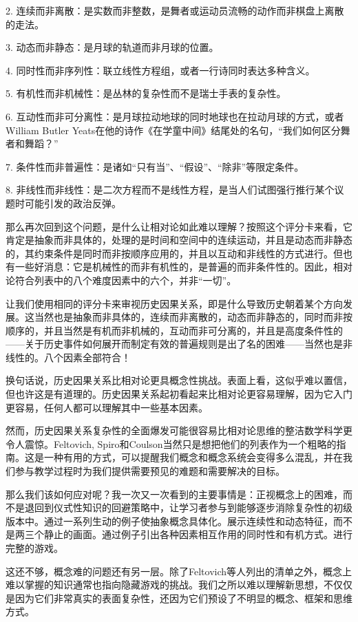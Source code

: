 2.	连续而非离散：是实数而非整数，是舞者或运动员流畅的动作而非棋盘上离散的走法。

3.	动态而非静态：是月球的轨道而非月球的位置。

4.	同时性而非序列性：联立线性方程组，或者一行诗同时表达多种含义。

5.	有机性而非机械性：是丛林的复杂性而不是瑞士手表的复杂性。

6.	互动性而非可分离性：是月球拉动地球的同时地球也在拉动月球的方式，或者William Butler Yeats在他的诗作《在学童中间》结尾处的名句，“我们如何区分舞者和舞蹈？”

7.	条件性而非普遍性：是诸如“只有当”、“假设”、“除非”等限定条件。

8.	非线性而非线性：是二次方程而不是线性方程，是当人们试图强行推行某个议题时可能引发的政治反弹。

那么再次回到这个问题，是什么让相对论如此难以理解？按照这个评分卡来看，它肯定是抽象而非具体的，处理的是时间和空间中的连续运动，并且是动态而非静态的，其约束条件是同时而非按顺序应用的，并且以互动和非线性的方式进行。但也有一些好消息：它是机械性的而非有机性的，是普遍的而非条件性的。因此，相对论符合列表中的八个难度因素中的六个，并非“一切”。

让我们使用相同的评分卡来审视历史因果关系，即是什么导致历史朝着某个方向发展。这当然也是抽象而非具体的，连续而非离散的，动态而非静态的，同时而非按顺序的，并且当然是有机而非机械的，互动而非可分离的，并且是高度条件性的——关于历史事件如何展开而制定有效的普遍规则是出了名的困难——当然也是非线性的。八个因素全部符合！

换句话说，历史因果关系比相对论更具概念性挑战。表面上看，这似乎难以置信，但也许这是有道理的。历史因果关系起初看起来比相对论更容易理解，因为它入门更容易，任何人都可以理解其中一些基本因素。

然而，历史因果关系复杂性的全面爆发可能很容易比相对论思维的整洁数学科学更令人震惊。Feltovich, Spiro和Coulson当然只是想把他们的列表作为一个粗略的指南。这是一种有用的方式，可以提醒我们概念和概念系统会变得多么混乱，并在我们参与教学过程时为我们提供需要预见的难题和需要解决的目标。

那么我们该如何应对呢？我一次又一次看到的主要事情是：正视概念上的困难，而不是退回到仪式性知识的回避策略中，让学习者参与到能够逐步消除复杂性的初级版本中。通过一系列生动的例子使抽象概念具体化。展示连续性和动态特征，而不是两三个静止的画面。通过例子引出各种因素相互作用的同时性和有机方式。进行完整的游戏。

这还不够，概念难的问题还有另一层。除了Feltovich等人列出的清单之外，概念上难以掌握的知识通常也指向隐藏游戏的挑战。我们之所以难以理解新思想，不仅仅是因为它们非常真实的表面复杂性，还因为它们预设了不明显的概念、框架和思维方式。


